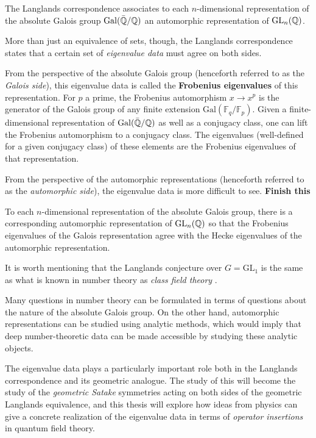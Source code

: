 \begin{idea}
	The Langlands correspondence associates to each $n$-dimensional representation of the absolute Galois group $\mathrm{Gal}(\bar {\mathbb{Q}}/\mathbb{Q})$ an automorphic representation of $\mathrm{GL}_n(\mathbb{Q})$.
\end{idea}
More than just an equivalence of sets, though, the Langlands correspondence states that a certain set of \emph{eigenvalue data} must agree on both sides. 

From the perspective of the absolute Galois group (henceforth referred to as the \emph{Galois side}), this eigenvalue data is called the \textbf{Frobenius eigenvalues} of this representation. For $p$ a prime, the Frobenius automorphism $x \to x^p$ is the generator of the Galois group of any finite extension $\mathrm{Gal}(\mathbb F_q/\mathbb F_p)$. Given a finite-dimensional representation of $\mathrm{Gal}(\bar {\mathbb{Q}}/\mathbb{Q})$ as well as a conjugacy class, one can lift the Frobenius automorphism to a conjugacy class. The eigenvalues (well-defined for a given conjugacy class) of these elements are the Frobenius eigenvalues of that representation. 

From the perspective of the automorphic representations (henceforth referred to as the \emph{automorphic side}), the eigenvalue data is more difficult to see. 
\textbf{Finish this}


\begin{conj}[Langlands]
	To each $n$-dimensional representation of the absolute Galois group, there is a corresponding automorphic representation of $\mathrm{GL}_n(\mathbb{Q})$ so that the Frobenius eigenvalues of the Galois representation agree with the Hecke eigenvalues of the automorphic representation.
\end{conj}

It is worth mentioning that the Langlands conjecture over $G = \mathrm{GL}_1$ is the same as what is known in number theory as \emph{class field theory} \cite{Yoo18}. 


Many questions in number theory can be formulated in terms of questions about the nature of the absolute Galois group. On the other hand, automorphic representations can be studied using analytic methods, which would imply that deep number-theoretic data can be made accessible by studying these analytic objects.

The eigenvalue data plays a particularly important role both in the Langlands correspondence and its geometric analogue. The study of this will become the study of the \emph{geometric Satake} symmetries acting on both sides of the geometric Langlands equivalence, and this thesis will explore how ideas from physics can give a concrete realization of the eigenvalue data in terms of \emph{operator insertions} in quantum field theory. 

